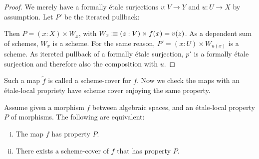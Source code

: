 \begin{proof}
  We merely have a formally étale surjections $v:V\to Y$ and $u:U\to X$ by assumption.
  Let $P'$ be the iterated pullback:
  \begin{center}
  \end{center}
  Then $P=(x:X)\times W_x$, with $W_x\vcentcolon\mspace{-1.2mu}\equiv (z:V)\times f(x)=v(z)$.
  As a dependent sum of schemes, $W_x$ is a scheme.
  For the same reason, $P'=(x:U)\times W_{u(x)}$ is a scheme.
  As itereted pullback of a formally étale surjection,
  $p'$ is a formally étale surjection and
  therefore also the composition with $u$.
\end{proof}

Such a map $\widetilde{f}$ is called a scheme-cover for $f$. Now we check the maps with an étale-local propriety have scheme cover enjoying the same property.

\begin{lemma}\label{scheme-replacement-nice-maps}
Assume given a morphism $f$ between algebraic spaces, and an étale-local property $P$ of morphisms. The following are equivalent:
\begin{enumerate}[(i)]
\item The map $f$ has property $P$. 
\item There exists a scheme-cover of $f$ that has property $P$.  
\end{enumerate}
\end{lemma}

